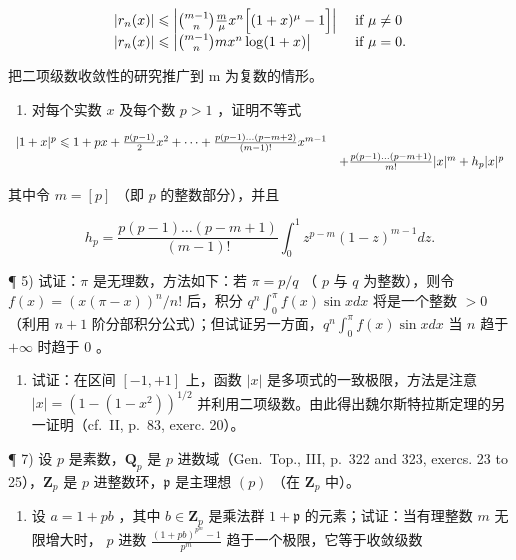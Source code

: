 \[
\begin{array}{l l} | r _ {n} (x) | \leqslant \left| \binom {m - 1} {n} \frac {m}{\mu} x ^ {n} \Big [ (1 + x) ^ {\mu} - 1 \Big ] \right| & \text { if } \mu \neq 0 \\ | r _ {n} (x) | \leqslant \left| \binom {m - 1} {n} m x ^ {n} \log (1 + x) \right| & \text { if } \mu = 0. \end{array}
\]

把二项级数收敛性的研究推广到 m 为复数的情形。

\begin{enumerate}
\def\labelenumi{\arabic{enumi})}
\setcounter{enumi}{3}
\tightlist
\item
  对每个实数 \(x\) 及每个数 \(p > 1\) ，证明不等式
\end{enumerate}

\[
\begin{array}{r l} | 1 + x | ^ {p} \leqslant 1 + p x + \frac {p (p - 1)}{2} x ^ {2} + \dots + \frac {p (p - 1) \dots (p - m + 2)}{(m - 1) !} x ^ {m - 1} \\ & + \frac {p (p - 1) \dots (p - m + 1)}{m !} | x | ^ {m} + h _ {p} | x | ^ {p} \end{array}
\]

其中令 \(m = [p]\) （即 \(p\) 的整数部分），并且

\[
h _ {p} = \frac {p (p - 1) \dots (p - m + 1)}{(m - 1) !} \int_ {0} ^ {1} z ^ {p - m} (1 - z) ^ {m - 1} d z.
\]

¶ 5) 试证：\(\pi\) 是无理数，方法如下：若 \(\pi = p/q\) （ \(p\) 与 \(q\) 为整数），则令 \(f(x) = (x(\pi - x))^n / n!\) 后，积分 \(q^n \int_0^\pi f(x) \sin x dx\) 将是一个整数 \(>0\) （利用 \(n + 1\) 阶分部积分公式）；但试证另一方面，\(q^n \int_0^\pi f(x) \sin x dx\) 当 \(n\) 趋于 \(+\infty\) 时趋于 0 。

\begin{enumerate}
\def\labelenumi{\arabic{enumi})}
\setcounter{enumi}{5}
\tightlist
\item
  试证：在区间 \([-1,+1]\) 上，函数 \(|x|\) 是多项式的一致极限，方法是注意 \(|x|=(1-(1-x^{2}))^{1/2}\) 并利用二项级数。由此得出魏尔斯特拉斯定理的另一证明（cf.~II, p.~83, exerc. 20）。
\end{enumerate}

¶ 7) 设 \(p\) 是素数，\(\mathbf{Q}_p\) 是 \(p\) 进数域（Gen.~Top., III, p.~322 and 323, exercs. 23 to 25），\(\mathbf{Z}_p\) 是 \(p\) 进整数环，\(\mathfrak{p}\) 是主理想 \((p)\) （在 \(\mathbf{Z}_p\) 中）。

\begin{enumerate}
\def\labelenumi{\alph{enumi})}
\tightlist
\item
  设 \(a = 1 + pb\) ，其中 \(b \in \mathbf{Z}_p\) 是乘法群 \(1 + \mathfrak{p}\) 的元素；试证：当有理整数 \(m\) 无限增大时， \(p\) 进数 \(\frac{(1 + pb)^{p^m} - 1}{p^m}\) 趋于一个极限，它等于收敛级数
\end{enumerate}

